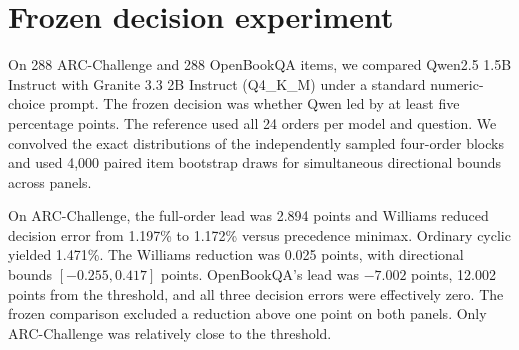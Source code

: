 \section{Frozen decision experiment}\label{app:frozen-decision}
On 288 ARC-Challenge and 288 OpenBookQA items, we compared Qwen2.5
1.5B Instruct with Granite 3.3 2B Instruct (Q4\_K\_M) under a
standard numeric-choice prompt. The frozen decision was whether
Qwen led by at least five percentage points. The reference used all
24 orders per model and question. We convolved the exact distributions
of the independently sampled four-order blocks and used 4,000 paired
item bootstrap draws for simultaneous directional bounds across panels.

On ARC-Challenge, the full-order lead was 2.894 points and Williams
reduced decision error from 1.197\% to 1.172\% versus precedence
minimax. Ordinary cyclic yielded 1.471\%. The Williams reduction was
0.025 points, with directional bounds $[-0.255, 0.417]$ points.
OpenBookQA's lead was $-7.002$ points, 12.002 points from the
threshold, and all three decision errors were effectively zero.
The frozen comparison excluded a reduction above one point on both
panels. Only ARC-Challenge was relatively close to the threshold.

